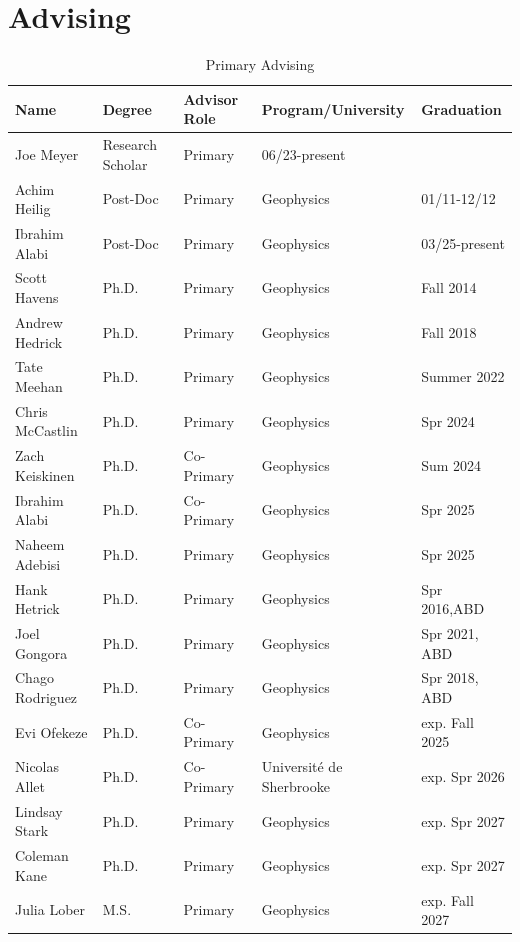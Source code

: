 \documentclass[11pt]{article}
\renewcommand\arraystretch{1}
\begin{document}
\pagebreak

\section*{Advising}
\begin{table}[!htbp]
\caption*{Primary Advising}
\small
\renewcommand\arraystretch{0.7}
  \centering
  \begin{tabular}{|l|l|l|l|l|}
\hline
\textbf{Name} & \textbf{Degree} & \textbf{Advisor Role} & \textbf{Program/University} & \textbf{Graduation} \\ \hline \hline
Joe Meyer & Research Scholar & Primary & 06/23-present \\ \hline
Achim Heilig & Post-Doc & Primary & Geophysics & 01/11-12/12 \\ \hline
Ibrahim Alabi & Post-Doc & Primary & Geophysics & 03/25-present \\ \hline
Scott Havens & Ph.D. & Primary & Geophysics & Fall 2014 \\ \hline
Andrew Hedrick & Ph.D. & Primary & Geophysics & Fall 2018 \\ \hline
Tate Meehan & Ph.D. & Primary & Geophysics & Summer 2022 \\ \hline
Chris McCastlin & Ph.D. & Primary & Geophysics & Spr 2024 \\ \hline
Zach Keiskinen & Ph.D. & Co-Primary & Geophysics & Sum 2024  \\ \hline
Ibrahim Alabi & Ph.D. & Co-Primary & Geophysics & Spr 2025  \\ \hline
Naheem Adebisi & Ph.D. & Primary & Geophysics & Spr 2025  \\ \hline
Hank Hetrick & Ph.D. & Primary & Geophysics & Spr 2016,ABD \\ \hline
Joel Gongora & Ph.D. & Primary & Geophysics & Spr 2021, ABD \\ \hline
Chago Rodriguez & Ph.D. & Primary & Geophysics & Spr 2018, ABD \\ \hline
Evi Ofekeze & Ph.D. & Co-Primary & Geophysics & exp. Fall 2025  \\ \hline
Nicolas Allet & Ph.D. & Co-Primary & Université de Sherbrooke & exp. Spr 2026 \\ \hline
Lindsay Stark & Ph.D. & Primary & Geophysics & exp. Spr 2027 \\ \hline
Coleman Kane & Ph.D. & Primary & Geophysics & exp. Spr 2027 \\ \hline
Julia Lober & M.S. & Primary & Geophysics & exp. Fall 2027 \\ \hline

\end{tabular}
\end{table}
\end{document}

